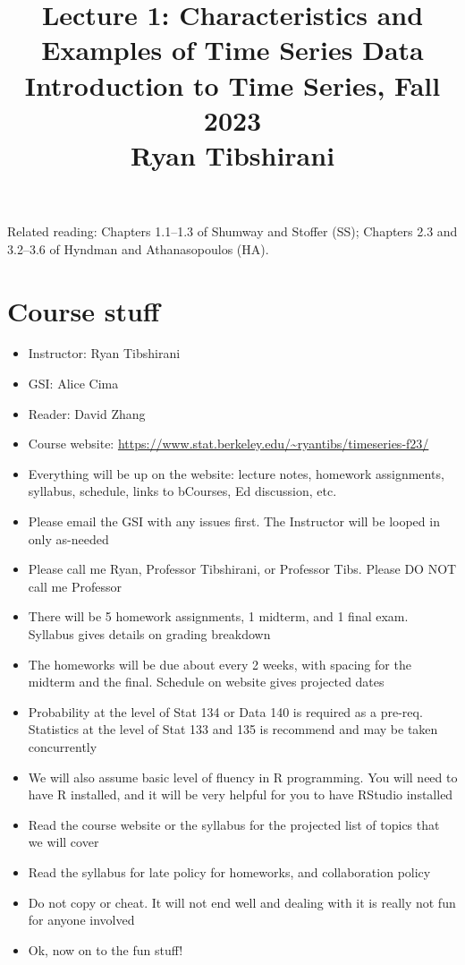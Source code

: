\documentclass{article}
\title{Lecture 1: Characteristics and Examples of Time Series Data \\ \smallskip  
\large Introduction to Time Series, Fall 2023 \\ \smallskip
Ryan Tibshirani}
\date{}
\begin{document}
\maketitle
\RaggedRight
\vspace{-50pt}

Related reading: Chapters 1.1--1.3 of Shumway and Stoffer (SS); Chapters 2.3 and   
3.2--3.6 of Hyndman and Athanasopoulos (HA). 

\section{Course stuff}

\begin{itemize}
\item Instructor: Ryan Tibshirani
\item GSI: Alice Cima
\item Reader: David Zhang
\item Course website:
  \url{https://www.stat.berkeley.edu/~ryantibs/timeseries-f23/}

\item Everything will be up on the website: lecture notes, homework assignments,
  syllabus, schedule, links to bCourses, Ed discussion, etc.

\item Please email the GSI with any issues first. The Instructor will be looped
  in only as-needed 

\item Please call me Ryan, Professor Tibshirani, or Professor Tibs. Please DO
  NOT call me Professor 

\item There will be 5 homework assignments, 1 midterm, and 1 final
  exam. Syllabus gives details on grading breakdown

\item The homeworks will be due about every 2 weeks, with spacing for the
  midterm and the final. Schedule on website gives projected dates

\item Probability at the level of Stat 134 or Data 140 is required as a
  pre-req. Statistics at the level of Stat 133 and 135 is recommend and may be
  taken concurrently

\item We will also assume basic level of fluency in R programming. You will need
  to have R installed, and it will be very helpful for you to have RStudio
  installed 

\item Read the course website or the syllabus for the projected list of topics
  that we will cover

\item Read the syllabus for late policy for homeworks, and collaboration policy 

\item Do not copy or cheat. It will not end well and dealing with it is really
  not fun for anyone involved

\item Ok, now on to the fun stuff!
\end{itemize}
\end{document}
